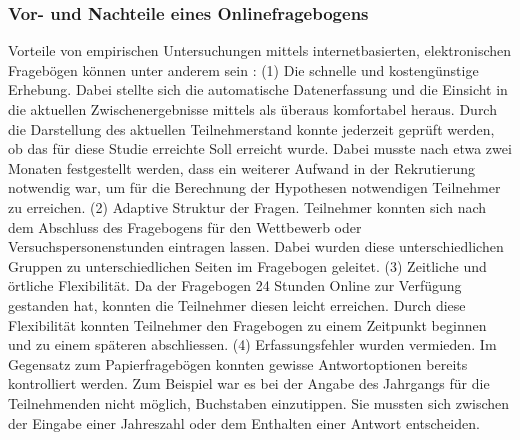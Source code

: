 \subsubsection{Vor- und Nachteile eines Onlinefragebogens}
Vorteile von empirischen Untersuchungen mittels internetbasierten, elektronischen Fragebögen können unter anderem sein \cite{Rey2009}: (1) Die schnelle und kostengünstige Erhebung. Dabei stellte sich die automatische Datenerfassung und die Einsicht in die aktuellen Zwischenergebnisse mittels  als überaus komfortabel heraus. Durch die Darstellung des aktuellen Teilnehmerstand konnte jederzeit geprüft werden, ob das für diese Studie erreichte Soll erreicht wurde. Dabei musste nach etwa zwei Monaten festgestellt werden, dass ein weiterer Aufwand in der Rekrutierung notwendig war, um für die Berechnung der Hypothesen notwendigen Teilnehmer zu erreichen. (2) Adaptive Struktur der Fragen. Teilnehmer konnten sich nach dem Abschluss des Fragebogens für den Wettbewerb oder Versuchspersonenstunden eintragen lassen. Dabei wurden diese unterschiedlichen Gruppen zu unterschiedlichen Seiten im Fragebogen geleitet. (3) Zeitliche und örtliche Flexibilität. Da der Fragebogen 24 Stunden Online zur Verfügung gestanden hat, konnten die Teilnehmer diesen leicht erreichen. Durch diese Flexibilität konnten Teilnehmer den Fragebogen zu einem Zeitpunkt beginnen und zu einem späteren abschliessen. (4) Erfassungsfehler wurden vermieden. Im Gegensatz zum Papierfragebögen konnten gewisse Antwortoptionen bereits kontrolliert werden. Zum Beispiel war es bei der Angabe des Jahrgangs für die Teilnehmenden nicht möglich, Buchstaben einzutippen. Sie mussten sich zwischen der Eingabe einer Jahreszahl oder dem Enthalten einer Antwort entscheiden. 
